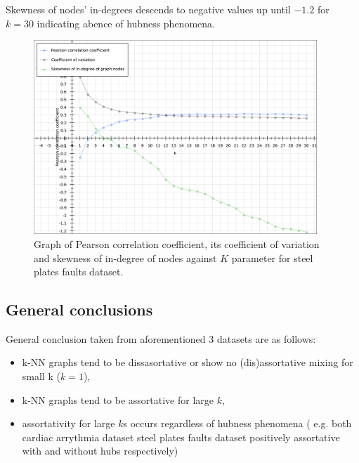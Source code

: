 Skewness of nodes' in-degrees descends to negative values up until $-1.2$ for $k = 30$ indicating abence of hubness phenomena.

\begin{figure}[h!]
  \centering
  \captionsetup{justification=centering}
    \includegraphics[width=0.95\textwidth]{images/faults_pearson.pdf}
  \caption{Graph of Pearson correlation coefficient, its coefficient of variation and skewness of in-degree of nodes against $K$ parameter for steel plates faults dataset.}
  \label{fig:graph_faults_pearson}
\end{figure}


\subsection{General conclusions}
General conclusion taken from aforementioned 3 datasets are as follows:
\begin{itemize}
\item k-NN graphs tend to be dissasortative or show no (dis)assortative mixing for small k ($k = 1$),
\item k-NN graphs tend to be assortative for large $k$,
\item assortativity for large $k$s occurs regardless of hubness phenomena ( e.g. both cardiac arrythmia dataset steel plates faults dataset positively assortative with and without hubs respectively) 
\end{itemize}

